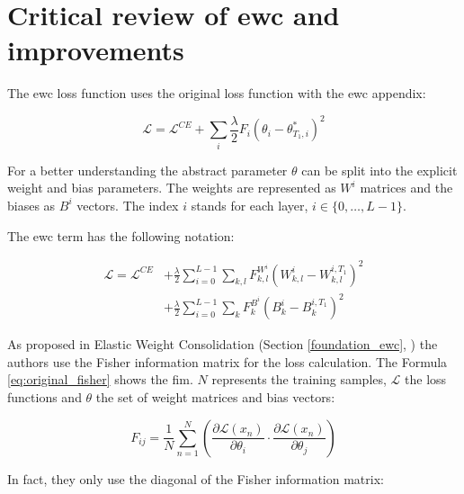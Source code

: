 \section{Critical review of \acrshort{ewc} and improvements}
\label{project_review_improvements}

The \acrshort{ewc} loss function uses the original loss function with the \acrshort{ewc} appendix:

\begin{equation}
    \mathcal{L} = 
    \mathcal{L}^{CE} 
    + \sum_{i} 
        \frac{\lambda}{2} 
        F_{i} 
        (\theta_{i} - \theta_{T_1,i}^{*})^2
\end{equation}

For a better understanding the abstract parameter $\theta$ can be split into the explicit weight and bias parameters.
The weights are represented as $W^i$ matrices and the biases as $B^i$ vectors.
The index $i$ stands for each layer, $i \in \{ 0, \dots, L-1 \}$.

The \acrshort{ewc} term has the following notation:

\begin{equation}
    \begin{split}
        \mathcal{L} = \mathcal{L}^{CE}
        & + \frac{\lambda}{2} \sum_{i=0}^{L-1} \sum_{k, l} F_{k, l}^{W^i}\left(W^i_{k, l}-W^{i,{T_1}}_{k, l} \right)^2
        \\
        & +  \frac{\lambda}{2}\sum_{i=0}^{L-1} \sum_{k}F^{B^i}_k\left(B^i_{k}-B^{i,{T_1}}_{k} \right)^2
    \end{split}
\end{equation}

As proposed in Elastic Weight Consolidation (Section \ref{foundation_ewc}, \cite{elastic-weight-consolidation}) the authors use the Fisher information matrix for the loss calculation.
The Formula \ref{eq:original_fisher} shows the \acrshort{fim}.
$N$ represents the training samples, $\mathcal{L}$ the loss functions and $\theta$ the set of weight matrices and bias vectors:

\begin{equation}
    F_{ij} = 
    \frac{1}{N} 
    \sum_{n=1}^{N} 
    \left(
        \frac{\partial \mathcal{L} \left( x_n \right) }{\partial \theta_{i}} 
        \cdot 
        \frac{\partial \mathcal{L} \left( x_n \right) }{\partial \theta_{j}}
    \right)
    \label{eq:original_fisher}
\end{equation}

In fact, they only use the diagonal of the Fisher information matrix:

